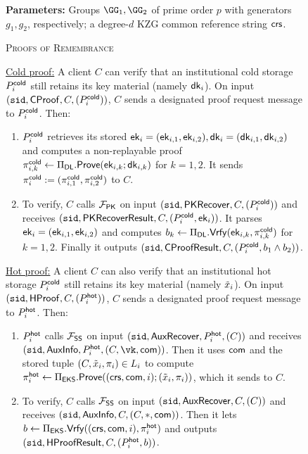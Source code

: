 \begin{figure*}
    \centering
    \begin{mdframed}
    \textbf{Parameters:} Groups $\GG_1, \GG_2$ of prime order $p$ with generators $g_1, g_2$, respectively; a degree-$d$ KZG common reference string $\mathsf{crs}$.
    \begin{center}
        \textsc{Proofs of Remembrance}
    \end{center}
    \underline{Cold proof:} A client $C$ can verify that an institutional cold storage $P_i^{\mathsf{cold}}$ still retains its key material (namely $\mathsf{dk}_i$). On input $(\texttt{sid}, \mathsf{CProof}, C, (P_i^{\mathsf{cold}}))$, $C$ sends a designated proof request message to $P_i^{\mathsf{cold}}$. Then:
    \begin{enumerate}
        \item $P_i^{\mathsf{cold}}$ retrieves its stored $\mathsf{ek}_i = (\mathsf{ek}_{i,1}, \mathsf{ek}_{i,2}), \mathsf{dk}_i = (\mathsf{dk}_{i,1}, \mathsf{dk}_{i,2})$ and computes a non-replayable proof $\pi_{i,k}^{\mathsf{cold}} \gets \Pi_{\sf DL}.\mathsf{Prove}(\mathsf{ek}_{i,k}; \mathsf{dk}_{i,k})$ for $k=1,2$. It sends $\pi_i^{\mathsf{cold}} := (\pi_{i,1}^{\mathsf{cold}}, \pi_{i,2}^{\mathsf{cold}})$ to $C$.
        \item To verify, $C$ calls $\mathcal{F}_\mathsf{PK}$ on input $(\texttt{sid}, \mathsf{PKRecover}, C, (P_i^{\mathsf{cold}}))$ and receives $(\texttt{sid}, \mathsf{PKRecoverResult}, C, (P_i^{\mathsf{cold}}, \mathsf{ek}_i))$. It parses $\mathsf{ek}_i = (\mathsf{ek}_{i,1}, \mathsf{ek}_{i,2})$ and computes $b_k \gets \Pi_{\sf DL}.\mathsf{Vrfy}(\mathsf{ek}_{i,k}, \pi_{i,k}^{\mathsf{cold}})$ for $k=1,2$. Finally it outputs $(\texttt{sid}, \mathsf{CProofResult}, C, (P_i^{\mathsf{cold}}, b_1 \land b_2))$.
    \end{enumerate}
    \underline{Hot proof:} A client $C$ can also verify that an institutional hot storage $P_i^{\mathsf{cold}}$ still retains its key material (namely $\tilde{x}_i$). On input $(\texttt{sid}, \mathsf{HProof}, C, (P_i^{\mathsf{hot}}))$, $C$ sends a designated proof request message to $P_i^{\mathsf{hot}}$. Then:
    \begin{enumerate}
        \item $P_i^{\mathsf{hot}}$ calls $\mathcal{F}_\mathsf{SS}$ on input $(\texttt{sid}, \mathsf{AuxRecover}, P_i^{\mathsf{hot}}, (C))$ and receives $(\sid, \mathsf{AuxInfo}, P_i^\hot, (C, \vk, \com))$. Then it uses $\mathsf{com}$ and the stored tuple $(C, \tilde{x}_i, \pi_i) \in L_i$ to compute $\pi_i^{\mathsf{hot}} \gets \Pi_{\sf EKS}.\mathsf{Prove}((\mathsf{crs}, \mathsf{com}, i);\allowbreak (\tilde{x}_i, \pi_i))$, which it sends to $C$.
        \item To verify, $C$ calls $\mathcal{F}_\mathsf{SS}$ on input $(\texttt{sid}, \mathsf{AuxRecover}, C, (C))$ and receives $(\texttt{sid}, \mathsf{AuxInfo}, C, (C, *, \mathsf{com}))$. Then it lets $b \gets \Pi_{\sf EKS}.\mathsf{Vrfy}((\mathsf{crs}, \mathsf{com}, i), \pi_i^{\mathsf{hot}})$ and outputs $(\texttt{sid}, \mathsf{HProofResult}, C, (P_i^{\mathsf{hot}}, b))$.

\end{enumerate}
\end{mdframed}
\end{figure*}
